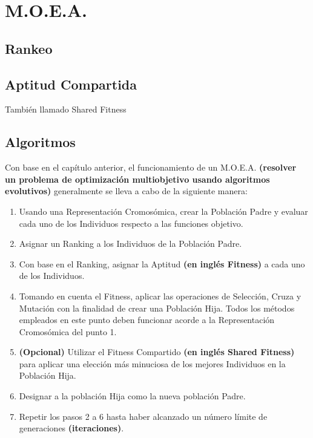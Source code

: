 \documentclass[class=report, crop=false]{standalone}
\begin{document}
\chapter {M.O.E.A.}


\section{Rankeo}

\section{Aptitud Compartida}  
También llamado Shared Fitness

\section{Algoritmos}
Con base en el capítulo anterior, el funcionamiento de un M.O.E.A. 
\textbf{(resolver un problema de optimización multiobjetivo usando 
algoritmos evolutivos)} generalmente se lleva a cabo de la siguiente 
manera:

\begin{enumerate}[1.]
\item Usando una Representación Cromosómica, crear la Población Padre y evaluar cada uno de los Individuos respecto a las funciones objetivo.

\item Asignar un Ranking a los Individuos de la Población Padre.  

\item Con base en el Ranking, asignar la Aptitud \textbf{(en inglés Fitness)} a cada uno de los Individuos.

\item Tomando en cuenta el Fitness, aplicar las operaciones de Selección, Cruza y Mutación con la finalidad de crear una Población Hija. Todos los métodos empleados en este punto deben funcionar acorde a la Representación Cromosómica del punto 1.

\item \textbf{(Opcional)} Utilizar el Fitness Compartido \textbf{(en inglés Shared Fitness)} para aplicar una elección más minuciosa de los mejores Individuos en la Población Hija. 

\item Designar a la población Hija como la nueva población Padre.

\item Repetir los pasos 2 a 6 hasta haber alcanzado un número límite de generaciones \textbf{(iteraciones)}. 
\end{enumerate}
\end{document}
